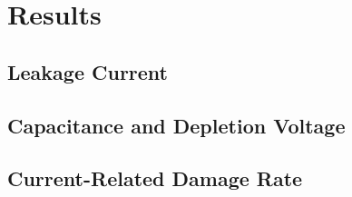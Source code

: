\section{Results}
\label{sec:results}

\subsection{Leakage Current}
\label{subsec:leakagecurrents}

\subsection{Capacitance and Depletion Voltage}
\label{subsec:Udep}

\subsection{Current-Related Damage Rate}
\label{subsec:alpha}